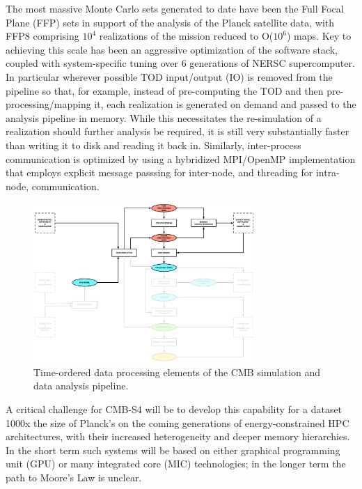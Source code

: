 The most massive Monte Carlo sets generated to date have been the Full Focal Plane (FFP) sets in support of the analysis of the Planck satellite data, with FFP8 comprising $10^4$ realizations of the mission reduced to O($10^6$) maps. Key to achieving this scale has been an aggressive optimization of the software stack, coupled with system-specific tuning over 6 generations of NERSC supercomputer. In particular wherever possible TOD input/output (IO) is removed from the pipeline so that, for example, instead of pre-computing the TOD and then pre-processing/mapping it, each realization is generated on demand and passed to the analysis pipeline in memory. While this necessitates the re-simulation of a realization should further analysis be required, it is still very substantially faster than writing it to disk and reading it back in. Similarly, inter-process communication is optimized by using a hybridized MPI/OpenMP implementation that employs explicit message passsing for inter-node, and threading for intra-node, communication.

\begin{figure}[tbp]
\centering
\includegraphics[width=0.75\textwidth]{Analysis/all_tod}
\caption{Time-ordered data processing elements of the CMB simulation and data analysis pipeline.}
\label{fig_all_tod}
\end{figure}

A critical challenge for CMB-S4 will be to develop this capability for a dataset 1000x the size of Planck's on the coming generations of energy-constrained HPC architectures, with their increased heterogeneity and deeper memory hierarchies. In the short term such systems will be based on either graphical programming unit (GPU) or many integrated core (MIC) technologies; in the longer term the path to Moore's Law is unclear.



%



